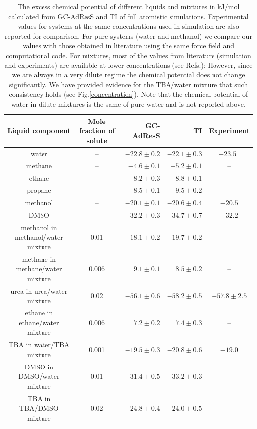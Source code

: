 \documentclass[a4paper,preprint,unsortedaddress]{revtex4-1}
\newcommand{\recheck}[1]{{\color{red} #1}}
\begin{document}
\begin{table}[]
\begin{center}
\begin{tabular}{ccrrc}
\hline \hline
 Liquid component & Mole fraction of solute & GC-AdResS & TI & Experiment \\
\hline
\recheck{water} & -- & $-22.8 \pm 0.2$  & $-22.1 \pm 0.3$ & $-23.5$~\cite{florian} \\
methane  & -- & $-4.6 \pm 0.1$  & $-5.2 \pm 0.1$ & -- \\
ethane   & -- & $-8.2 \pm 0.3$  & $-8.8 \pm 0.1$ & -- \\
propane  & -- & $-8.5 \pm 0.1$ & $-9.5 \pm 0.2$ & -- \\
\recheck{methanol}  & -- & $-20.1 \pm 0.1$ & $-20.6 \pm 0.4$ & $-20.5$ \cite{vang}  \\
DMSO & -- & $-32.2 \pm 0.3$ & $-34.7 \pm 0.7$ & $-32.2$ \cite{dmso}  \\
\recheck{methanol in methanol/water mixture} & 0.01 & $-18.1 \pm 0.2$ & $-19.7 \pm 0.2$ & -- \\
\recheck{methane in methane/water mixture} & 0.006 & $9.1 \pm 0.1$  & $8.5 \pm 0.2$ & -- \\
urea in urea/water mixture & 0.02 & $-56.1 \pm 0.6$ & $-58.2 \pm 0.5$ & $-57.8 \pm 2.5$ \cite{urea} \\
\recheck{ethane in ethane/water mixture} & 0.006 & $7.2 \pm 0.2$ & $7.4 \pm 0.3$ & -- \\ 
\recheck{TBA in water/TBA mixture} & 0.001 & $-19.5 \pm 0.3$ & $-20.8 \pm 0.6$ & $-19.0$ \cite{nico} \\
DMSO in DMSO/water mixture & 0.01 & $-31.4 \pm 0.5$ & $-33.2 \pm 0.3$ & -- \\
TBA in TBA/DMSO mixture & 0.02 & $-24.8 \pm 0.4$ & $-24.0 \pm 0.5$ & -- \\
\hline \hline
\end{tabular}
\caption{The excess chemical potential of different liquids and mixtures in kJ/mol calculated from GC-AdResS and TI of full atomistic simulations. Experimental values for systems at the same concentrations used in simulation are also reported for comparison. For pure systems (water and methanol) we compare our values with those obtained in literature using the same force field and computational code. For mixtures, most of the values from literature (simulation and experiments) are available at lower concentrations (see Refs.\cite{vang,nico}); However, since we are always in a very dilute regime the chemical potential does not change significantly. \recheck{We have provided evidence for the TBA/water mixture that such consistency holds (see Fig.\ref{concentration})}. Note that the chemical potential of water in dilute mixtures is the same of pure water and is not reported above.
}
\label{table}
\end{center}
\end{table}
\end{document}
